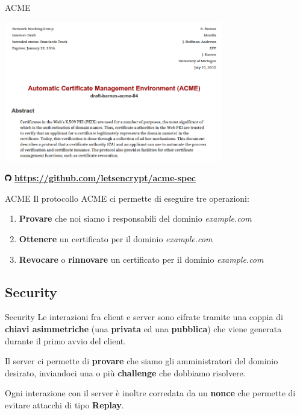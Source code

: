 \documentclass[xcolor=svgnames,11pt]{beamer}
\begin{document}
\begin{frame}{ACME}
\begin{center}
\includegraphics[width=9.5cm]{img/acme_spec.png}

\includegraphics[width=0.3cm]{img/logo_gh.pdf} \textbf{ \url{https://github.com/letsencrypt/acme-spec}}
\end{center}
\end{frame}


\begin{frame}{ACME}
Il protocollo ACME ci permette di eseguire tre operazioni:
\pause\medskip
\begin{enumerate}
  \item \textbf{Provare} che noi siamo i responsabili del dominio \emph{example.com}
  \pause\medskip
  \item \textbf{Ottenere} un certificato per il dominio \emph{example.com}
  \pause\medskip
  \item \textbf{Revocare} o \textbf{rinnovare} un certificato per il dominio \emph{example.com}
\end{enumerate}
\end{frame}

\subsection{Security}
\begin{frame}{Security}
Le interazioni fra client e server sono cifrate tramite una coppia di \textbf{chiavi asimmetriche}
(una \textbf{privata} ed una \textbf{pubblica}) che viene generata durante il primo avvio del client.

\medskip \pause

\begin{block}{}
Il server ci permette di \textbf{provare} che siamo gli amministratori del dominio desirato, inviandoci
una o più \textbf{challenge} che dobbiamo risolvere.
\end{block}

\medskip \pause

Ogni interazione con il server è inoltre corredata da un \textbf{nonce} che permette di evitare attacchi
di tipo \textbf{Replay}.

\end{frame}
\end{document}
